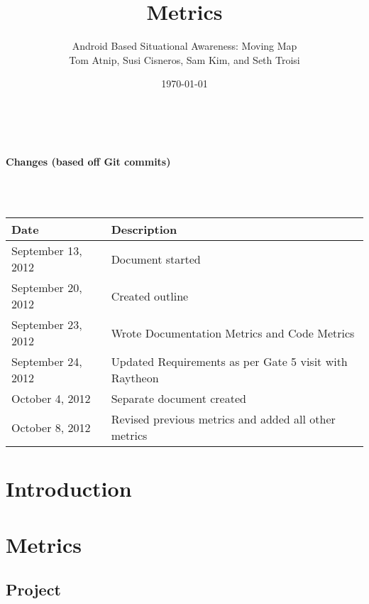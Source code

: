 \documentclass{article}
\begin{document}
\setlength{\voffset}{3.5in}
\title{Metrics}
\author{\Large Android Based Situational Awareness: Moving Map\\
Tom Atnip, Susi Cisneros, Sam Kim, and Seth Troisi}
\date{\today}
\maketitle
\clearpage
\setlength{\voffset}{0pt}
\tableofcontents
\clearpage
~\\
\begin{Large}\textbf{Changes (based off Git commits)}\end{Large}\\
~\\
\begin{tabular}{ | p{1.5in} | p{4.5in} | }
\hline
\textbf{Date} & \textbf{Description}\\
\hline
\hline
September 13, 2012 & Document started\\
\hline
September 20, 2012 & Created outline\\
\hline
September 23, 2012 & Wrote Documentation Metrics and Code Metrics\\
\hline
September 24, 2012 & Updated Requirements as per Gate 5 visit with Raytheon\\
\hline
October 4, 2012 & Separate document created\\
\hline
October 8, 2012 & Revised previous metrics and added all other metrics\\
\hline
\end{tabular}
\clearpage

\section{Introduction}

\section{Metrics}
\subsection{Project}
\end{document}
